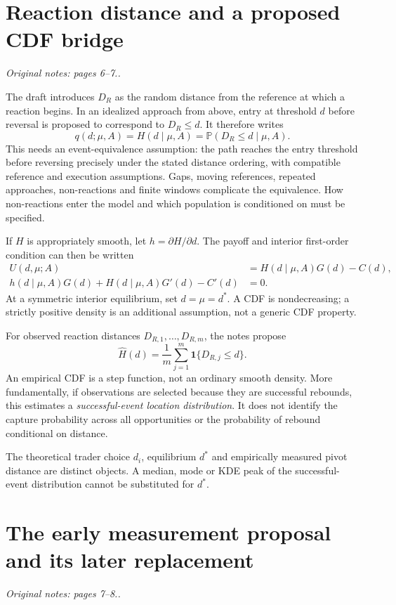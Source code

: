 \documentclass[11pt,a4paper]{article}
\newcommand{\Prb}{\mathbb{P}}
\newcommand{\sourcepage}[1]{\textit{Original notes: #1.}}
\begin{document}
\section{Reaction distance and a proposed CDF bridge}
\sourcepage{pages 6--7.}

The draft introduces $D_R$ as the random distance from the reference at which
a reaction begins. In an idealized approach from above, entry at threshold $d$
before reversal is proposed to correspond to $D_R\leq d$. It therefore writes
\begin{equation}
 q(d;\mu,A)=H(d\mid\mu,A)
          =\Prb(D_R\leq d\mid\mu,A).
\end{equation}
This needs an event-equivalence assumption: the path reaches the entry threshold
before reversing precisely under the stated distance ordering, with compatible
reference and execution assumptions. Gaps, moving references, repeated
approaches, non-reactions and finite windows complicate the equivalence.
How non-reactions enter the model and which population is conditioned on must
be specified.

If $H$ is appropriately smooth, let $h=\partial H/\partial d$. The payoff
and interior first-order condition can then be written
\begin{align}
 U(d,\mu;A)&=H(d\mid\mu,A)G(d)-C(d),\\
 h(d\mid\mu,A)G(d)+H(d\mid\mu,A)G'(d)-C'(d)&=0.
\end{align}
At a symmetric interior equilibrium, set $d=\mu=d^*$.
A CDF is nondecreasing; a strictly positive density is an additional
assumption, not a generic CDF property.

For observed reaction distances $D_{R,1},\ldots,D_{R,m}$, the notes propose
\begin{equation}
 \widehat H(d)=\frac1m\sum_{j=1}^{m}\mathbf{1}\{D_{R,j}\leq d\}.
\end{equation}
An empirical CDF is a step function, not an ordinary smooth density.
More fundamentally, if observations are selected because they are successful
rebounds, this estimates a \emph{successful-event location distribution}.
It does not identify the capture probability across all opportunities or
the probability of rebound conditional on distance.

The theoretical trader choice $d_i$, equilibrium $d^*$ and empirically measured
pivot distance are distinct objects. A median, mode or KDE peak of the
successful-event distribution cannot be substituted for $d^*$.

\section{The early measurement proposal and its later replacement}
\label{sec:oldmeasurement}
\sourcepage{pages 7--8.}
\end{document}
